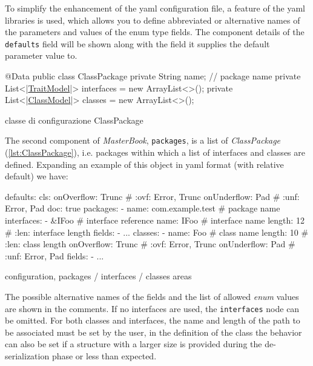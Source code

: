 \documentclass[a4paper,10pt]{report}
\newenvironment{elisting}[1][H]
  {\captionsetup{aboveskip=0pt}\begin{listing}[#1]}
  {\end{listing}%
}
\begin{document}
To simplify the enhancement of the yaml configuration file, a feature of the 
yaml libraries is used, which allows you to define abbreviated or alternative 
names of the parameters and values of the enum type fields. 
The component details of the \texttt{defaults} field will be shown along with 
the field it supplies the default parameter value to.

\begin{elisting}[!htb]
\begin{javacode}
@Data
public class ClassPackage {
    private String name;     // package name
    private List<|\hyperref[lst:TraitModel]{TraitModel}|> interfaces = new ArrayList<>();
    private List<|\hyperref[lst:ClassModel]{ClassModel}|> classes = new ArrayList<>();
}
\end{javacode}
\caption{classe di configurazione ClassPackage}
\label{lst:ClassPackage}
\end{elisting}
The second component of \textsl{MasterBook}, \texttt{packages}, is a list of 
\textsl{ClassPackage} (\ref{lst:ClassPackage}), i.e. packages within which a 
list of interfaces and classes are defined. 
Expanding an example of this object in yaml format (with relative default) 
we have:

\begin{elisting}[!htb]
\begin{yamlcode}
defaults:
  cls:
    onOverflow: Trunc   # :ovf: Error, Trunc
    onUnderflow: Pad    # :unf: Error, Pad
    doc: true
packages:
  - name: com.example.test  # package name
    interfaces:
      - &IFoo         # interface reference
        name: IFoo    # interface name
        length: 12    # :len: interface length
        fields:
          - ...
    classes:
      - name: Foo           # class name
        length: 10          # :len: class length
        onOverflow: Trunc   # :ovf: Error, Trunc
        onUnderflow: Pad    # :unf: Error, Pad
        fields:
          - ...
\end{yamlcode}
\caption{configuration, packages / interfaces / classes areas}
\label{lst:pakg-conf}
\end{elisting}
The possible alternative names of the fields and the list of allowed 
\textsl{enum} values are shown in the comments. 
If no interfaces are used, the \texttt{interfaces} node can be omitted. 
For both classes and interfaces, the name and length of the path to be 
associated must be set by the user, in the definition of the class the behavior 
can also be set if a structure with a larger size is provided during 
the de-serialization phase or less than expected.
\end{document}
